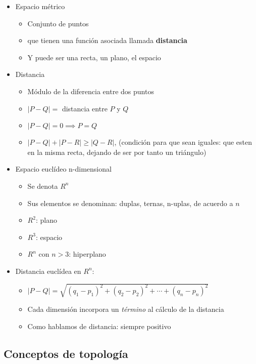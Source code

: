 \begin{itemize}
    \item Espacio métrico
    \begin{itemize}
        \item Conjunto de puntos 
        \item que tienen una función asociada llamada \textbf{distancia}
        \item Y puede ser una recta, un plano, el espacio
    \end{itemize}
    \item Distancia 
    \begin{itemize}
        \item Módulo de la diferencia entre dos puntos 
        \item \(|P-Q| =\) distancia entre \(P\) y \(Q\)
        \item \(|P-Q| = 0 \implies P = Q\)
        \item \(|P-Q| + |P-R| \geq |Q-R|\), 
        (condición para que sean iguales: 
        que esten en la misma recta,
        dejando de ser por tanto un triángulo)
    \end{itemize}
    \item Espacio euclídeo n-dimensional
    \begin{itemize}
        \item Se denota \(R^{n}\)
        \item Sus elementos se denominan: duplas, ternas, n-uplas,
        de acuerdo a \(n\)
        \item \(R^{2}\): plano
        \item \(R^{3}\): espacio
        \item \(R^{n}\) con \(n>3\): hiperplano
    \end{itemize}
    \item Distancia euclídea en \(R^{n}\):
    \begin{itemize}
        \item \(|P-Q| = \sqrt{(q_1-p_1)^{2} + (q_2-p_2)^{2} + \cdots + (q_n-p_n)^{2}}\)
        \item Cada dimensión incorpora un \textit{término} al cálculo de la 
        distancia 
        \item Como hablamos de distancia: siempre positivo 
    \end{itemize}
\end{itemize}

\subsection{Conceptos de topología}

